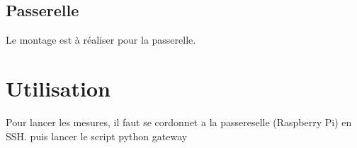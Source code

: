 \documentclass[a4paper,10pt]{article}
\begin{document}
\subsection{Passerelle}
Le montage est à réaliser pour la passerelle.
\section{Utilisation}
Pour lancer les mesures, il faut se cordonnet a la passereselle (Raspberry Pi) en SSH.
puis lancer le script python gateway 



\medskip

%
\end{document}
